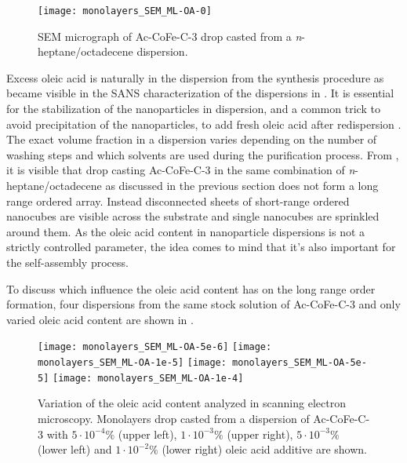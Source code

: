 \documentclass[\main/dresen_thesis.tex]{subfiles}
\begin{document}
  \begin{figure}[!htbp]
    \centering
    \texttt{[image: monolayers\_SEM\_ML-OA-0]}
    \caption{\label{fig:monolayers:preparation:solventVariation:NoOAAddend}SEM micrograph of Ac-CoFe-C-3 drop casted from a \textit{n}-heptane/octadecene dispersion.}
  \end{figure}

  Excess oleic acid is naturally in the dispersion from the synthesis procedure as became visible in the SANS characterization of the dispersions in .
  It is essential for the stabilization of the nanoparticles in dispersion, and a common trick to avoid precipitation of the nanoparticles, to add fresh oleic acid after redispersion \cite{Wetterskog_2014_Preci}.
  The exact volume fraction in a dispersion varies depending on the number of washing steps and which solvents are used during the purification process.
  From , it is visible that drop casting Ac-CoFe-C-3 in the same combination of \textit{n}-heptane/octadecene as discussed in the previous section does not form a long range ordered array.
  Instead disconnected sheets of short-range ordered nanocubes are visible across the substrate and single nanocubes are sprinkled around them.
  As the oleic acid content in nanoparticle dispersions is not a strictly controlled parameter, the idea comes to mind that it's also important for the self-assembly process.

  To discuss which influence the oleic acid content has on the long range order formation, four dispersions from the same stock solution of Ac-CoFe-C-3 and only varied oleic acid content are shown in .

  \begin{figure}[tb]
    \centering
    \texttt{[image: monolayers\_SEM\_ML-OA-5e-6]}
    \texttt{[image: monolayers\_SEM\_ML-OA-1e-5]}
    \texttt{[image: monolayers\_SEM\_ML-OA-5e-5]}
    \texttt{[image: monolayers\_SEM\_ML-OA-1e-4]}
    \caption{\label{fig:monolayers:preparation:solventVariation:OAAddend}Variation of the oleic acid content analyzed in scanning electron microscopy. Monolayers drop casted from a dispersion of Ac-CoFe-C-3 with $5\cdot10^{-4} \unit{\%}$ (upper left), $1\cdot10^{-3} \unit{\%}$ (upper right), $5\cdot10^{-3} \unit{\%}$ (lower left) and $1\cdot10^{-2} \unit{\%}$ (lower right) oleic acid additive are shown.}
  \end{figure}
\end{document}
